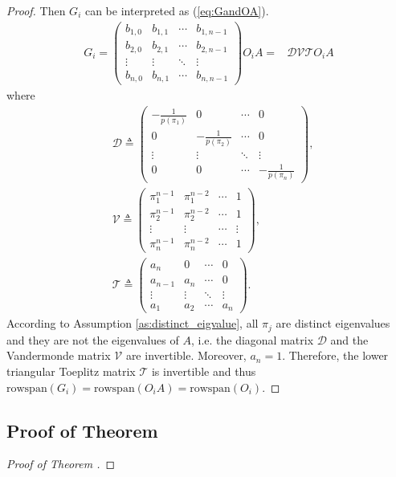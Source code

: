 \documentclass[12pt]{article}
\newcommand{\rs}{\text{rowspan}}
\newtheorem*{proof}{\textbf{Proof}}
\begin{document}
\begin{proof}
	Then $G_i$ can be interpreted as (\ref{eq:GandOA}).
		\begin{align}
		G_i = \begin{pmatrix}
			b_{1,0} & b_{1,1} & \cdots  & b_{1,n-1} \\
			b_{2,0} & b_{2,1} & \cdots  & b_{2,n-1} \\
			\vdots & \vdots & \ddots  & \vdots \\
			b_{n,0} & b_{n,1} & \cdots  & b_{n,n-1} 
		\end{pmatrix}
		O_i A 
		= & \mathcal{D}\mathcal{V}\mathcal{T}O_i A \label{eq:GandOA}		
	\end{align}
	where 
	\begin{align*}
		&\mathcal{D}\triangleq\begin{pmatrix}
			-\frac{1}{p(\pi_1)} & 0 & \cdots  & 0 \\
			0 & -\frac{1}{p(\pi_2)} & \cdots  & 0 \\
			\vdots & \vdots & \ddots  & \vdots \\
			0 & 0 & \cdots  & -\frac{1}{p(\pi_n)}
		\end{pmatrix}, \\
	&\mathcal{V}\triangleq
		\begin{pmatrix}
			\pi_1^{n-1} & \pi_1^{n-2} & \cdots  & 1 \\
			\pi_2^{n-1} & \pi_2^{n-2} & \cdots  & 1 \\
			\vdots & \vdots & \cdots  & \vdots \\
			\pi_n^{n-1} & \pi_n^{n-2} & \cdots  & 1
		\end{pmatrix}, \\
	&\mathcal{T}\triangleq
		\begin{pmatrix}
			a_n & 0 & \cdots &   0 \\
			a_{n-1} & a_n & \cdots &   0 \\
			\vdots & \vdots & \ddots  & \vdots \\
			a_1 & a_2 & \cdots  & a_n 
		\end{pmatrix}.
	\end{align*}
	According to Assumption \ref{as:distinct_eigvalue}, all $\pi_j$ are distinct eigenvalues and they are not the eigenvalues of $A$, i.e. the diagonal matrix $\mathcal{D}$ and the Vandermonde matrix $\mathcal{V}$ are invertible. Moreover, $a_n=1$. Therefore, the lower triangular Toeplitz matrix $\mathcal{T}$ is invertible and thus $\rs(G_i)=\rs(O_i A)=\rs(O_i)$. 		
\end{proof}

\subsection{Proof of Theorem }
\begin{proof}[Proof of Theorem ]

	
\end{proof}



%	

\end{document}
